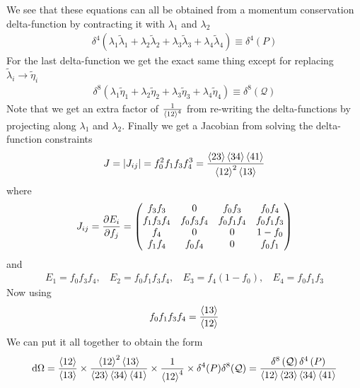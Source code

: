 \documentclass[letter,11pt]{article}
\begin{document}
We see that these equations can all be obtained from a momentum conservation delta-function by contracting it with $\lambda_1$ and $\lambda_2$
\begin{equation}
\begin{aligned}
	\delta^{4}(\lambda_1\tilde\lambda_1+\lambda_2\tilde\lambda_2+\lambda_3\tilde\lambda_3+\lambda_4\tilde\lambda_4)\equiv \delta^{4}\left(P\right)
\end{aligned}
\end{equation}
For the last delta-function we get the exact same thing except for replacing $\tilde \lambda_i\to \tilde \eta_i$
\begin{equation}
\begin{aligned}
	\delta^{8}(\lambda_1\tilde\eta_1+\lambda_2\tilde\eta_2+\lambda_3\tilde\eta_3+\lambda_4\tilde\eta_4)\equiv \delta^{8}\left(\mathcal{Q}\right)
\end{aligned}
\end{equation}
Note that we get an extra factor of $\frac{1}{\expval{12}^4}$ from re-writing the delta-functions by projecting along $\lambda_1$ and $\lambda_2$. Finally we get a Jacobian from solving the delta-function constraints
\begin{equation}
	\begin{aligned}
		J=\left|J_{ij}\right|=f_0^2f_1f_3f_4^3=\frac{\expval{23}\expval{34}\expval{41}}{\expval{12}^2\expval{13}}
	\end{aligned}
\end{equation}
where
\begin{equation}
	\begin{aligned}
		J_{ij}=\pdv{E_i}{f_j}=\begin{pmatrix}
			f_3f_3 & 0 & f_0f_3 & f_0f_4\\
			f_1f_3f_4 &f_0f_3f_4 &f_0f_1f_4 & f_0f_1f_3\\
			f_4 & 0 & 0 & 1-f_0\\
			f_1f_4 & f_0f_4 & 0 & f_0f_1
		\end{pmatrix}
	\end{aligned}
\end{equation}
and 
\begin{equation}
	\begin{aligned}
		E_1=f_0f_3f_4,~~~~E_2=f_0f_1f_3f_4,~~~~E_3=f_4(1-f_0),~~~~E_4=f_0f_1f_3
	\end{aligned}
\end{equation}
Now using
\begin{equation}
	\begin{aligned}
		f_0f_1f_3f_4=\frac{\expval{13}}{\expval{12}}
	\end{aligned}
\end{equation}
We can put it all together to obtain the form
\begin{equation}
	\begin{aligned}
		\dd \Omega =\frac{\expval{12}}{\expval{13}}\times \frac{\expval{12}^2\expval{13}}{
			\expval{23}\expval{34}\expval{41}}\times \frac{1}{\expval{12}^4}\times \delta^4(P)\delta^8(\mathcal{Q})=\frac{\delta^{8}\left(\mathcal{Q}\right)\delta^{4}\left(P\right)}{\expval{12}\expval{23}\expval{34}\expval{41}}
	\end{aligned}
\end{equation}
\end{document}
